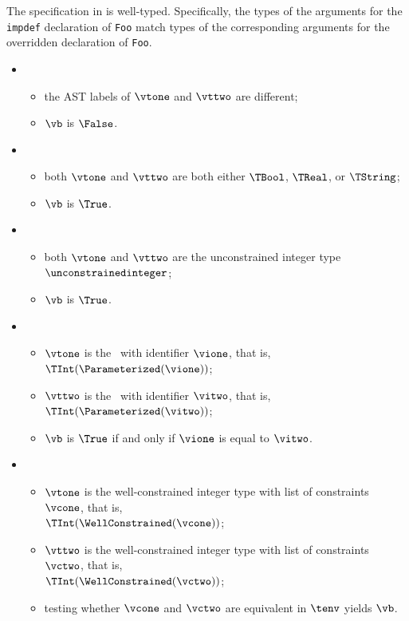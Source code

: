 The specification in  is well-typed.
Specifically, the types of the arguments for the \verb|impdef| declaration
of \verb|Foo| match types of the corresponding arguments for the overridden declaration
of \verb|Foo|.

\ProseParagraph
\OneApplies
\begin{itemize}
  \item {}
  \begin{itemize}
    \item the AST labels of $\vtone$ and $\vttwo$ are different;
    \item $\vb$ is $\False$.
  \end{itemize}

  \item {}
  \begin{itemize}
    \item both $\vtone$ and $\vttwo$ are both either $\TBool$, $\TReal$, or $\TString$;
    \item $\vb$ is $\True$.
  \end{itemize}

  \item {}
  \begin{itemize}
    \item both $\vtone$ and $\vttwo$ are the unconstrained integer type $\unconstrainedinteger$;
    \item $\vb$ is $\True$.
  \end{itemize}

  \item {}
  \begin{itemize}
    \item $\vtone$ is the \parameterizedintegertypeterm\  with identifier $\vione$, that is, \\ $\TInt(\Parameterized(\vione))$;
    \item $\vttwo$ is the \parameterizedintegertypeterm\ with identifier $\vitwo$, that is, \\ $\TInt(\Parameterized(\vitwo))$;
    \item $\vb$ is $\True$ if and only if $\vione$ is equal to $\vitwo$.
  \end{itemize}

  \item {}
  \begin{itemize}
    \item $\vtone$ is the well-constrained integer type with list of constraints $\vcone$, that is, \\ $\TInt(\WellConstrained(\vcone))$;
    \item $\vttwo$ is the well-constrained integer type with list of constraints $\vctwo$, that is, \\ $\TInt(\WellConstrained(\vctwo))$;
    \item testing whether $\vcone$ and $\vctwo$ are equivalent in $\tenv$ yields $\vb$\ProseOrTypeError.
  \end{itemize}


\end{itemize}
